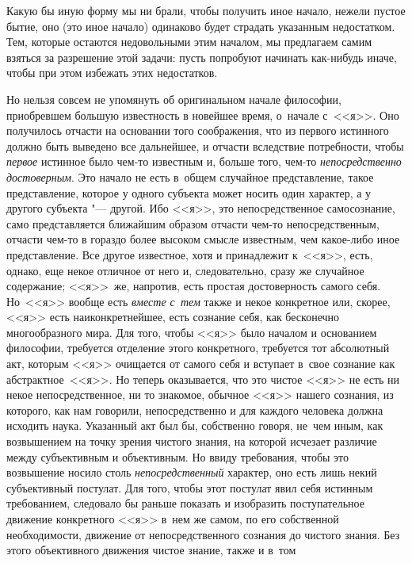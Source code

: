 Какую бы иную форму мы ни брали, чтобы получить иное начало, нежели пустое
бытие, оно (это иное начало) одинаково будет страдать указанным недостатком.
Тем, которые остаются недовольными этим началом, мы предлагаем самим взяться
за разрешение этой задачи: пусть попробуют начинать как-нибудь иначе, чтобы
при этом избежать этих недостатков.

Но нельзя совсем не упомянуть об оригинальном начале философии, приобревшем
большую известность в новейшее время, о~начале с~<<я>>. Оно получилось отчасти на основании того соображения,
что из первого истинного должно быть выведено все дальнейшее, и отчасти
вследствие потребности, чтобы {\em первое} истинное было чем-то известным и,
больше того, чем-то {\em непосредственно достоверным}. Это начало не есть
в~общем случайное представление, такое представление, которое у одного субъекта
может носить один характер, а у другого субъекта "--- другой. Ибо <<я>>, это
непосредственное самосознание, само представляется ближайшим образом отчасти
чем-то непосредственным, отчасти чем-то в гораздо более высоком смысле
известным, чем какое-либо иное представление. Все другое известное, хотя и
принадлежит к~<<я>>, есть, однако, еще некое отличное от него и, следовательно,
сразу же случайное содержание; <<я>>~же, напротив, есть простая достоверность
самого себя. Но~<<я>> вообще есть {\em вместе с~тем} также и некое конкретное
или, скорее, <<я>> есть наиконкретнейшее, есть сознание себя, как бесконечно
многообразного мира. Для того, чтобы <<я>> было началом и основанием философии,
требуется отделение этого конкретного, требуется тот абсолютный акт, которым
<<я>> очищается от самого себя и вступает в~свое сознание как
абстрактное~<<я>>. Но теперь оказывается, что это чистое <<я>> не есть ни некое
непосредственное, ни то знакомое, обычное <<я>> нашего сознания, из которого,
как нам говорили, непосредственно и для каждого человека должна исходить наука.
Указанный акт был бы, собственно говоря, не~чем иным, как возвышением на точку
зрения чистого знания, на которой исчезает различие между субъективным и
объективным. Но ввиду требования, чтобы это возвышение носило столь
{\em непосредственный} характер, оно есть лишь некий субъективный постулат. Для
того, чтобы этот постулат явил себя истинным требованием, следовало бы раньше
показать и изобразить поступательное движение конкретного <<я>> в~нем же самом,
по его собственной необходимости, движение от непосредственного сознания до
чистого знания. Без этого объективного движения чистое знание, также и в~том
